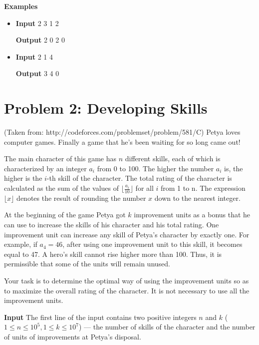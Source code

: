 \normalfont\documentclass[letterpaper,11pt]{article}
\begin{document}
\textbf{Examples}
\begin{itemize}
\item \textbf{Input}   2 3 1 2

\textbf{Output}  2 0 2 0 \newline

\item \textbf{Input}   2 1 4

\textbf{Output}  3 4 0

\end{itemize}

\newpage


\section*{Problem 2: Developing Skills}
(Taken from: http://codeforces.com/problemset/problem/581/C) \newline
Petya loves computer games. Finally a game that he's been waiting for so long came out!

The main character of this game has $n$ different skills, each of which is characterized by an integer $a_i$ from 0 to 100. The higher the number $a_i$ is, the higher is the $i$-th skill of the character. The total rating of the character is calculated as the sum of the values ​​of $\lfloor \frac{a_i}{10} \rfloor$ for all $i$ from 1 to n. The expression $\lfloor x \rfloor$ denotes the result of rounding the number $x$ down to the nearest integer.

At the beginning of the game Petya got $k$ improvement units as a bonus that he can use to increase the skills of his character and his total rating. One improvement unit can increase any skill of Petya's character by exactly one. For example, if $a_4 = 46$, after using one improvement unit to this skill, it becomes equal to 47. A hero's skill cannot rise higher more than 100. Thus, it is permissible that some of the units will remain unused.

Your task is to determine the optimal way of using the improvement units so as to maximize the overall rating of the character. It is not necessary to use all the improvement units.

\textbf{Input} \newline
The first line of the input contains two positive integers $n$ and $k$ ($1 \leq n \leq 10^5, 1 \leq k \leq 10^7$) — the number of skills of the character and the number of units of improvements at Petya's disposal.
\end{document}
